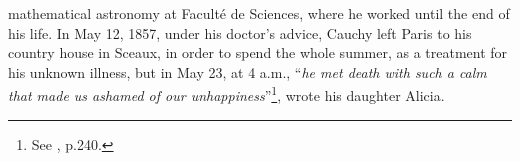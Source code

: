 mathematical astronomy at Facult\'e de Sciences, where he worked until the end of his life. In May 12, 1857, under his doctor's advice, Cauchy left Paris to his country house in Sceaux, in order to spend the whole summer, as a treatment for his unknown illness, but in May 23, at 4 a.m., ``\emph{he met death with such a calm that made us ashamed of our unhappiness}''\footnote{See \cite{belhoste_1991_1}, p.240.}, wrote his daughter Alicia.                 

%


                   



